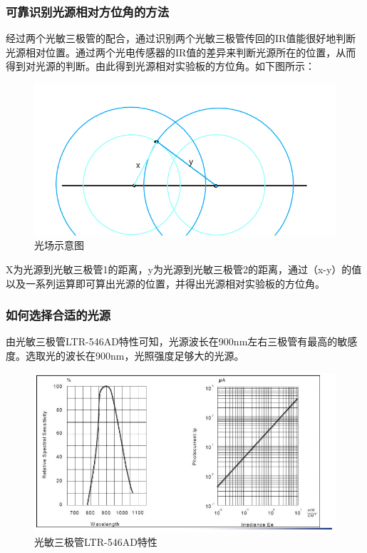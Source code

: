 \subsubsection{可靠识别光源相对方位角的方法}
\par{经过两个光敏三极管的配合，通过识别两个光敏三极管传回的IR值能很好地判断光源相对位置。通过两个光电传感器的IR值的差异来判断光源所在的位置，从而得到对光源的判断。由此得到光源相对实验板的方位角。如下图所示：}

\begin{figure}[H]
\centering
\includegraphics[width=12cm]{figure/1.2.1.png}
\caption{光场示意图} \label{fig:1.2.1}
\end{figure}

\par{X为光源到光敏三极管1的距离，y为光源到光敏三极管2的距离，通过（x-y）的值以及一系列运算即可算出光源的位置，并得出光源相对实验板的方位角。}

\subsubsection{如何选择合适的光源}
\par{由光敏三极管LTR-546AD特性可知，光源波长在900nm左右三极管有最高的敏感度。选取光的波长在900nm，光照强度足够大的光源。}

\begin{figure}[H]
\centering
\includegraphics[width=12cm]{figure/1.1.1.png}
\caption{光敏三极管LTR-546AD特性} \label{fig:1.1.1}
\end{figure}

